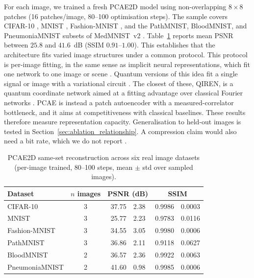 \documentclass[pdflatex,sn-basic]{sn-jnl}
\begin{document}
For each image, we trained a fresh PCAE2D model using non-overlapping $8\times8$
patches (16 patches/image, 80--100 optimisation steps). The sample covers
CIFAR-10 \citep{Krizhevsky2009}, MNIST \citep{LeCun1998}, Fashion-MNIST
\citep{Xiao2017}, and the PathMNIST, BloodMNIST, and PneumoniaMNIST subsets of
MedMNIST~v2 \citep{Yang2023}. Table~\ref{tab:sameset_multi_dataset} reports mean
PSNR between $25.8$ and $41.6$~dB (SSIM $0.91$--$1.00$). This establishes that
the architecture fits varied image structures under a common protocol.
This protocol is per-image fitting, in the same sense as implicit neural
representations, which fit one network to one image or scene
\citep{Ulyanov2020DIP, Sitzmann2020, Tancik2020, Mildenhall2020NeRF,
Dupont2021COIN, Strumpler2022}. Quantum versions of this idea fit a single
signal or image with a variational circuit \citep{Zhao2024QIREN,
Fujihashi2024QINC, LizzioBosco2026QISR}. The closest of these, QIREN, is a
quantum coordinate network aimed at a fitting advantage over classical Fourier
networks \citep{Zhao2024QIREN}. PCAE is instead a patch autoencoder with a
measured-correlator bottleneck, and it aims at competitiveness with classical
baselines. These results therefore measure representation capacity.
Generalisation to held-out images is tested in
Section~\ref{sec:ablation_relationship}. A compression claim would also need a bit
rate, which we do not report \citep{Dupont2021COIN, Strumpler2022}.

\begin{table}[t]
  \centering
  \caption{PCAE2D same-set reconstruction across six real image datasets
           (per-image trained, 80--100 steps, mean $\pm$ std over sampled
           images).}
  \label{tab:sameset_multi_dataset}
  \begin{tabular}{@{}l c r@{\,$\pm$\,}l r@{\,$\pm$\,}l@{}}
    \toprule
    Dataset          & $n$ images & \multicolumn{2}{c}{PSNR (dB)} & \multicolumn{2}{c}{SSIM} \\
    \midrule
    CIFAR-10         & 3 & 37.75 & 2.38 & 0.9986 & 0.0003 \\
    MNIST            & 3 & 25.77 & 2.23 & 0.9783 & 0.0116 \\
    Fashion-MNIST    & 3 & 34.55 & 3.05 & 0.9980 & 0.0006 \\
    PathMNIST        & 3 & 36.86 & 2.11 & 0.9118 & 0.0627 \\
    BloodMNIST       & 2 & 36.57 & 2.36 & 0.9922 & 0.0063 \\
    PneumoniaMNIST   & 2 & 41.60 & 0.98 & 0.9985 & 0.0006 \\
    \bottomrule
  \end{tabular}
\end{table}
\end{document}

